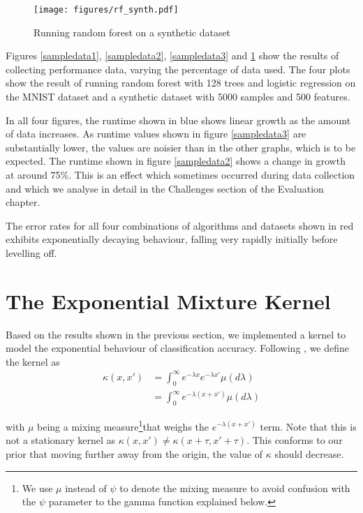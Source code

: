\documentclass[a4paper,12pt,twoside,openright]{report}
\begin{document}
\begin{figure}
\centering
  \texttt{[image: figures/rf\_synth.pdf]}
  \caption{Running random forest on a synthetic dataset}
  \label{sampledata4}
\end{figure}

Figures \ref{sampledata1}, \ref{sampledata2}, \ref{sampledata3} and \ref{sampledata4} show the results of collecting performance data, varying the percentage of data used. The four plots show the result of running random forest with 128 trees and logistic regression on the MNIST dataset and a synthetic dataset with 5000 samples and 500 features.

In all four figures, the runtime shown in blue shows linear growth as the amount of data increases. As runtime values shown in figure \ref{sampledata3} are substantially lower, the values are noisier than in the other graphs, which is to be expected. The runtime shown in figure \ref{sampledata2} shows a change in growth at around 75\%. This is an effect which sometimes occurred during data collection and which we analyse in detail in the Challenges section of the Evaluation chapter.

The error rates for all four combinations of algorithms and datasets shown in red exhibits exponentially decaying behaviour, falling very rapidly initially before levelling off.









\section{The Exponential Mixture Kernel}

Based on the results shown in the previous section, we implemented a kernel to model the exponential behaviour of classification accuracy. Following \cite{2014arXiv1406.3896S}, we define the kernel as
\begin{align}
\kappa(x,x') &= \int_{0}^{\infty} e^{-\lambda x}e^{-\lambda x'}\mu(d\lambda)\\
&= \int_{0}^{\infty} e^{-\lambda(x+x')}\mu(d\lambda)
\end{align}

with $\mu$ being a mixing measure\footnote{We use $\mu$ instead of $\psi$ to denote the mixing measure to avoid confusion with the $\psi$ parameter to the gamma function explained below.}that weighs the $e^{-\lambda(x+x')}$ term. Note that this is not a stationary kernel as $\kappa(x, x') \neq \kappa(x + \tau, x' + \tau)$. This conforms to our prior that moving further away from the origin, the value of $\kappa$ should decrease.
\end{document}
